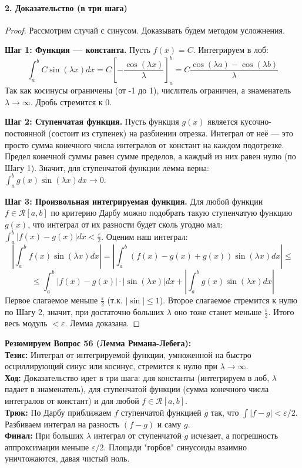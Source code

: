\paragraph{2. Доказательство (в три шага)}
\begin{proof}
Рассмотрим случай с синусом. Доказывать будем методом усложнения.

\textbf{Шаг 1: Функция — константа.} Пусть $f(x) = C$. Интегрируем в лоб:
$$ \int_a^b C \sin(\lambda x) dx = C \left[ -\frac{\cos(\lambda x)}{\lambda} \right]_a^b = C \frac{\cos(\lambda a) - \cos(\lambda b)}{\lambda} $$
Так как косинусы ограничены (от -1 до 1), числитель ограничен, а знаменатель $\lambda \to \infty$. Дробь стремится к 0.

\textbf{Шаг 2: Ступенчатая функция.} Пусть функция $g(x)$ является кусочно-постоянной (состоит из ступенек) на разбиении отрезка. Интеграл от неё — это просто сумма конечного числа интегралов от констант на каждом подотрезке. Предел конечной суммы равен сумме пределов, а каждый из них равен нулю (по Шагу 1). Значит, для ступенчатой функции лемма верна: $\int_a^b g(x) \sin(\lambda x) dx \to 0$.

\textbf{Шаг 3: Произвольная интегрируемая функция.} Для любой функции $f \in \mathcal{R}[a,b]$ по критерию Дарбу можно подобрать такую ступенчатую функцию $g(x)$, что интеграл от их разности будет сколь угодно мал: $\int_a^b |f(x) - g(x)| dx < \frac{\varepsilon}{2}$. 
Оценим наш интеграл:
$$ \left| \int_a^b f(x) \sin(\lambda x) dx \right| = \left| \int_a^b (f(x) - g(x) + g(x)) \sin(\lambda x) dx \right| \le $$
$$ \le \int_a^b |f(x) - g(x)| \cdot |\sin(\lambda x)| dx + \left| \int_a^b g(x) \sin(\lambda x) dx \right| $$
Первое слагаемое меньше $\frac{\varepsilon}{2}$ (т.к. $|\sin| \le 1$). Второе слагаемое стремится к нулю по Шагу 2, значит, при достаточно больших $\lambda$ оно тоже станет меньше $\frac{\varepsilon}{2}$. Итого весь модуль $< \varepsilon$. Лемма доказана.
\end{proof}
\begin{tcolorbox}[colback=gray!5, colframe=black, boxrule=0.5pt, arc=0pt]
\textbf{Резюмируем Вопрос 56 (Лемма Римана-Лебега):} \\
\textbf{Тезис:} Интеграл от интегрируемой функции, умноженной на быстро осциллирующий синус или косинус, стремится к нулю при $\lambda \to \infty$. \\
\textbf{Ход:} Доказательство идет в три шага: для константы (интегрируем в лоб, $\lambda$ падает в знаменатель), для ступенчатой функции (сумма конечного числа интегралов от констант) и для любой $f \in \mathcal{R}[a,b]$. \\
\textbf{Трюк:} По Дарбу приближаем $f$ ступенчатой функцией $g$ так, что $\int |f - g| < \varepsilon/2$. Разбиваем интеграл на разность $(f-g)$ и саму $g$. \\
\textbf{Финал:} При больших $\lambda$ интеграл от ступенчатой $g$ исчезает, а погрешность аппроксимации меньше $\varepsilon/2$. Площади "горбов" синусоиды взаимно уничтожаются, давая чистый ноль.
\end{tcolorbox}



